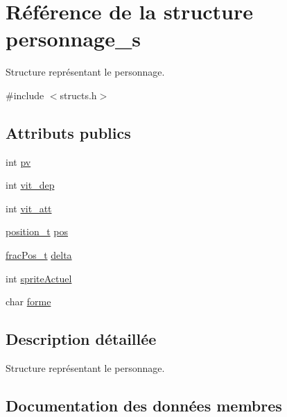 \hypertarget{structpersonnage__s}{}\section{Référence de la structure personnage\+\_\+s}
\label{structpersonnage__s}


Structure représentant le personnage.  




{\ttfamily \#include $<$structs.\+h$>$}

\subsection*{Attributs publics}
\begin{DoxyCompactItemize}
\item 
int \hyperlink{structpersonnage__s_ab3090d9110756af454516f939e9f8a86}{pv}
\item 
int \hyperlink{structpersonnage__s_a6899a0efdc3a3fccb060aaf06b4e4b8d}{vit\+\_\+dep}
\item 
int \hyperlink{structpersonnage__s_a0022973bab638a02774a19710cedcd17}{vit\+\_\+att}
\item 
\hyperlink{structposition__s}{position\+\_\+t} \hyperlink{structpersonnage__s_adea4789f8b55587ec092f3a32b7b1964}{pos}
\item 
\hyperlink{structfrac_pos__s}{frac\+Pos\+\_\+t} \hyperlink{structpersonnage__s_a396d01ba0660ce2327f65f891d4f239e}{delta}
\item 
int \hyperlink{structpersonnage__s_aec4def382ab17941f0edfe1c40f0cc59}{sprite\+Actuel}
\item 
char \hyperlink{structpersonnage__s_a1f1eb200420640259201a84300bccf7e}{forme}
\end{DoxyCompactItemize}


\subsection{Description détaillée}
Structure représentant le personnage. 

\subsection{Documentation des données membres}
\mbox{\label{structpersonnage__s_a396d01ba0660ce2327f65f891d4f239e}} 
